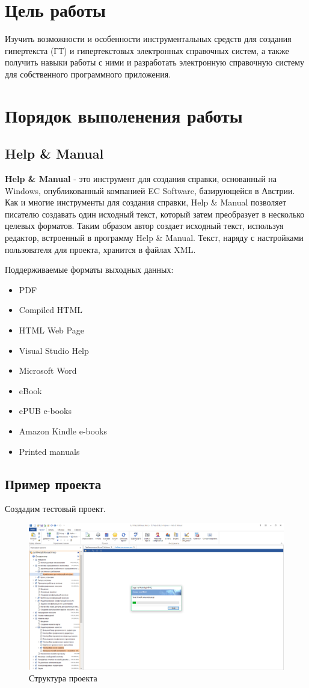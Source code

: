 	\section{Цель работы}
		Изучить возможности и особенности инструментальных средств для создания гипертекста (ГТ) и гипертекстовых электронных справочных систем, а также получить навыки работы с ними и разработать электронную справочную систему для собственного программного приложения. 
	\section{Порядок выполенения работы}
	
		\subsection{Help \& Manual}
			\textbf{Help \& Manual} - это инструмент для создания справки, основанный на Windows, опубликованный компанией EC Software, базирующейся в Австрии. Как и многие инструменты для создания справки, Help \& Manual позволяет писателю создавать один исходный текст, который затем преобразует в несколько целевых форматов. Таким образом автор создает исходный текст, используя редактор, встроенный в программу Help \& Manual. Текст, наряду с настройками пользователя для проекта, хранится в файлах XML.
			
			Поддерживаемые форматы выходных данных:
			\begin{itemize}
				\item PDF
				\item Compiled HTML
				\item HTML Web Page
				\item Visual Studio Help
				\item Microsoft Word
				\item eBook 
				\item ePUB e-books
				\item Amazon Kindle e-books
				\item Printed manuals
			\end{itemize}
		
		\subsection{Пример проекта}
		
		Создадим тестовый проект.
			
		\begin{figure}[h]
			\centering
			\includegraphics[width=0.7\linewidth]{images/creation}
			\caption{Структура проекта}
			\label{fig:creation}
		\end{figure}
	
